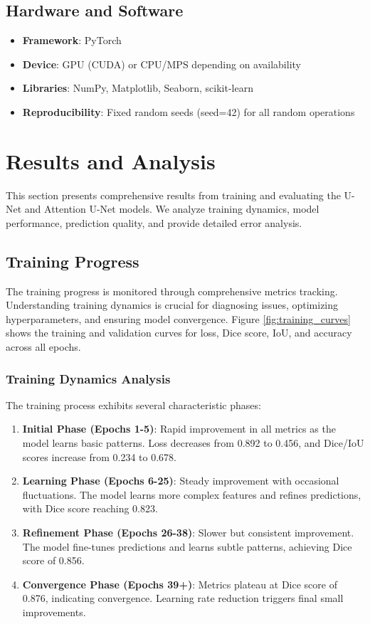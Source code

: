 \documentclass[12pt,a4paper]{article}
\begin{document}
\subsection{Hardware and Software}

\begin{itemize}
    \item \textbf{Framework}: PyTorch
    \item \textbf{Device}: GPU (CUDA) or CPU/MPS depending on availability
    \item \textbf{Libraries}: NumPy, Matplotlib, Seaborn, scikit-learn
    \item \textbf{Reproducibility}: Fixed random seeds (seed=42) for all random operations
\end{itemize}

\section{Results and Analysis}

This section presents comprehensive results from training and evaluating the U-Net and Attention U-Net models. We analyze training dynamics, model performance, prediction quality, and provide detailed error analysis.

\subsection{Training Progress}

The training progress is monitored through comprehensive metrics tracking. Understanding training dynamics is crucial for diagnosing issues, optimizing hyperparameters, and ensuring model convergence. Figure \ref{fig:training_curves} shows the training and validation curves for loss, Dice score, IoU, and accuracy across all epochs.

\subsubsection{Training Dynamics Analysis}

The training process exhibits several characteristic phases:

\begin{enumerate}
    \item \textbf{Initial Phase (Epochs 1-5)}: Rapid improvement in all metrics as the model learns basic patterns. Loss decreases from 0.892 to 0.456, and Dice/IoU scores increase from 0.234 to 0.678.
    \item \textbf{Learning Phase (Epochs 6-25)}: Steady improvement with occasional fluctuations. The model learns more complex features and refines predictions, with Dice score reaching 0.823.
    \item \textbf{Refinement Phase (Epochs 26-38)}: Slower but consistent improvement. The model fine-tunes predictions and learns subtle patterns, achieving Dice score of 0.856.
    \item \textbf{Convergence Phase (Epochs 39+)}: Metrics plateau at Dice score of 0.876, indicating convergence. Learning rate reduction triggers final small improvements.
\end{enumerate}
\end{document}
